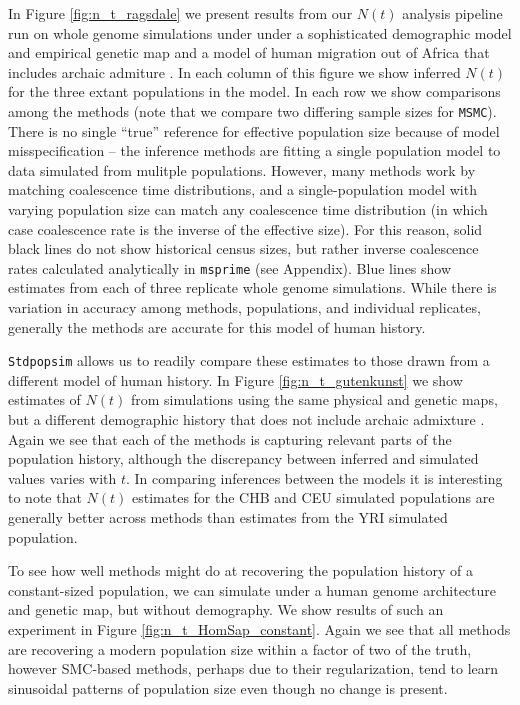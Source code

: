 \documentclass[12pt,halfline,a4paper]{ouparticle}
\newcommand{\Stdpopsim}{\texttt{Stdpopsim}\xspace}
\newcommand{\MSMC}{\texttt{MSMC}\xspace}
\begin{document}
In Figure \ref{fig:n_t_ragsdale} we present results from our $N(t)$ analysis pipeline
run on whole genome simulations under under a sophisticated demographic model
and empirical genetic map and a model of human migration out of Africa
that includes archaic admiture \citep{ragsdale2019models}. In each column of this figure
we show inferred $N(t)$ for the three extant populations in the model.
In each row we show comparisons among the methods (note that we compare two differing
sample sizes for \MSMC).
There is no single ``true'' reference for effective population size
because of model misspecification -- the inference methods are fitting a single population model
to data simulated from mulitple populations.
However, many methods work by matching coalescence time distributions,
and a single-population model with varying population size can match any coalescence time distribution
(in which case coalescence rate is the inverse of the effective size).
For this reason, solid black lines do not show historical census sizes,
but rather inverse coalescence rates calculated analytically in \texttt{msprime} (see Appendix).
Blue lines show estimates from each of three replicate whole genome simulations.
While there is variation in accuracy among methods, populations, and individual replicates,
generally the methods are accurate for this model of human history.

\Stdpopsim allows us to readily compare these estimates to those drawn from a different
model of human history. In Figure \ref{fig:n_t_gutenkunst} we show estimates of
$N(t)$ from simulations using the same physical and genetic maps, but a different demographic
history that does not include archaic admixture \citep{gutenkunst2009inferring}. Again we see that each
of the methods is capturing relevant parts of the population history, although the
discrepancy between inferred and simulated values varies with $t$. In comparing inferences between the
models it is interesting to note that $N(t)$ estimates for the CHB and CEU
simulated populations are generally better across methods than estimates from the YRI
simulated population.

To see how well methods might do at recovering the population history of a constant-sized population,
we can simulate under a human genome architecture and genetic map, but without demography.
We show results of such an
experiment in Figure \ref{fig:n_t_HomSap_constant}. Again we see that all methods
are recovering a modern population size within a factor of two of the truth, however
SMC-based methods, perhaps due to their regularization, tend to learn sinusoidal
patterns of population size even though no change is present.
\end{document}
